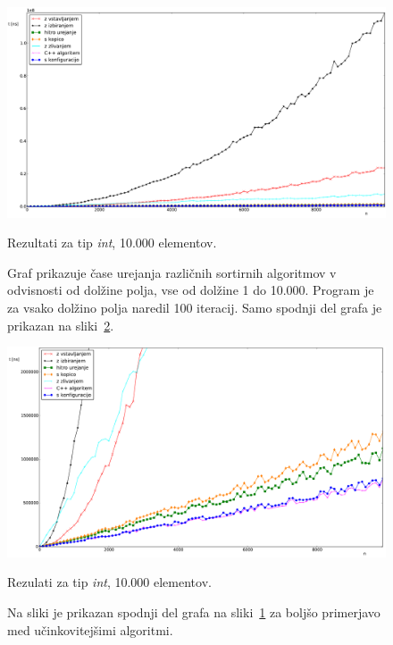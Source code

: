 \documentclass[a4paper,oneside,12pt]{article}
\begin{document}
\begin{figure}[h!]
    \includegraphics[width=\textwidth]{slike/int10000.pdf}
    \vspace{-0.7cm}
    \caption[Rezultati za tip  \emph{int}, 10.000 el.]{Rezultati za tip
    \emph{int}, 10.000 elementov.} 
    \caption*{{\small Graf prikazuje čase
    urejanja različnih sortirnih algoritmov v odvisnosti od dolžine polja, vse
    od dolžine 1 do 10.000. Program je za vsako dolžino polja naredil 100
    iteracij. Samo spodnji del grafa je prikazan na
    sliki~\ref{fig:rez:intblizu}.}}
    \label{fig:rez:int}
\end{figure}

\begin{figure}[h!]
    \begin{center}
        \includegraphics[width=\textwidth]{slike/int10000zoom.pdf}
    \end{center}
    \vspace{-0.7cm}
    \caption[Rezultati za tip \emph{int}, 10.000 el. -- izrez]{Rezulati za tip
    \emph{int}, 10.000 elementov.}
    \caption*{{\small Na sliki je prikazan
    spodnji del grafa na sliki~\ref{fig:rez:int} za boljšo primerjavo med
    učinkovitejšimi algoritmi.}}
    \label{fig:rez:intblizu}
\end{figure}
\end{document}
